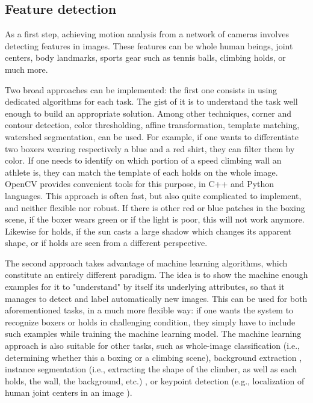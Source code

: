 \subsection{Feature detection}

As a first step, achieving motion analysis from a network of cameras involves detecting features in images. These features can be whole human beings, joint centers, body landmarks, sports gear such as tennis balls, climbing holds, or much more. 

Two broad approaches can be implemented: the first one consists in using dedicated algorithms for each task. The gist of it is to understand the task well enough to build an appropriate solution. Among other techniques, corner and contour detection, color thresholding, affine transformation, template matching, watershed segmentation, can be used. For example, if one wants to differentiate two boxers wearing respectively a blue and a red shirt, they can filter them by color. If one needs to identify on which portion of a speed climbing wall an athlete is, they can match the template of each holds on the whole image. OpenCV \cite{Bradski2000} provides convenient tools for this purpose, in C++ and Python languages. This approach is often fast, but also quite complicated to implement, and neither flexible nor robust. If there is other red or blue patches in the boxing scene, if the boxer wears green or if the light is poor, this will not work anymore. Likewise for holds, if the sun casts a large shadow which changes its apparent shape, or if holds are seen from a different perspective.

The second approach takes advantage of machine learning algorithms, which constitute an entirely different paradigm. The idea is to show the machine enough examples for it to "understand" by itself its underlying attributes, so that it manages to detect and label automatically new images. This can be used for both aforementioned tasks, in a much more flexible way: if one wants the system to recognize boxers or holds in challenging condition, they simply have to include such examples while training the machine learning model. The machine learning approach is also suitable for other tasks, such as whole-image classification (i.e., determining whether this a boxing or a climbing scene), background extraction \cite{Bouwmans2019}, instance segmentation (i.e., extracting the shape of the climber, as well as each holds, the wall, the background, etc.) \cite{Minaee2021}, or keypoint detection (e.g., localization of human joint centers in an image \cite{Chen2020}). 



